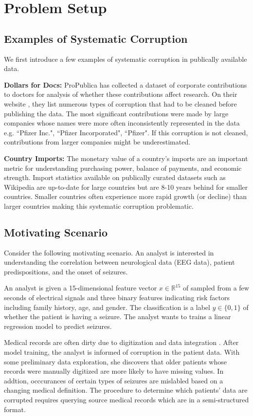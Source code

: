\section{Problem Setup}\label{background}

\subsection{Examples of Systematic Corruption}
We first introduce a few examples of systematic corruption in publically available data.

\noindent\textbf{Dollars for Docs: }
ProPublica has collected a dataset of corporate contributions to doctors for analysis of whether these contributions affect research.
On their website \cite{dollarsfordocs}, they list numerous types of corruption that had to be cleaned before publishing the data.
The most significant contributions were made by large companies whose names were more often inconsistently represented in the data e.g. ``Pfizer Inc.", ``Pfizer Incorporated", ``Pfizer".
If this corruption is not cleaned, contributions from larger companies might be underestimated.

\noindent\textbf{Country Imports: }
The monetary value of a country's imports are an important metric for understanding purchasing power, balance of payments, and economic strength. 
Import statistics available on publically curated datasets such as Wikipedia \cite{importstats} are up-to-date for large countries but are 8-10 years behind for smaller countries. 
Smaller countries often experience more rapid growth (or decline) than larger countries making this systematic corruption problematic.

\subsection{Motivating Scenario}
Consider the following motivating scenario.
An analyst is interested in understanding the correlation between neurological data (EEG data), patient predispositions, and the onset of seizures.

\begin{example}
An analyst is given a 15-dimensional feature vector $x \in \mathbb{R}^{15}$ of sampled from a few seconds of electrical signals and three binary features indicating risk factors including family history, age, and gender.
The classification is a label $y\in \{0,1\}$ of whether the patient is having a seizure.
The analyst wants to trains a linear regression model to predict seizures.

Medical records are often dirty due to digitization and data integration \cite{fortunearticle}.
After model training, the analyst is informed of corruption in the patient data.
With some preliminary data exploration, she discovers that older patients whose records were manually digitized are more likely to have missing values.
In addtion, occcurances of certain types of seizures are mislabled based on a changing medical definition.
The procedure to determine which patients' data are corrupted requires querying source medical records which are in a semi-structured format.
\end{example}

